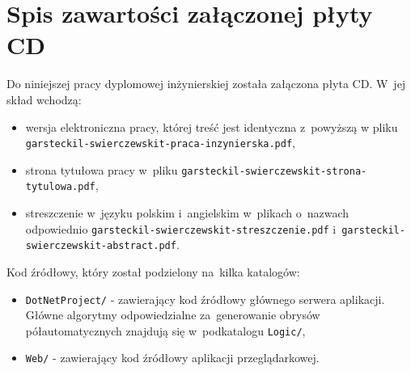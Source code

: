 \documentclass[a4paper,11pt,twoside,openright]{report}
\newcommand\blankpage{%
    \null
    \thispagestyle{empty}%
    \newpage}
\theoremstyle{definition}
\begin{document}



\listoffigures
{}


\afterpage{\blankpage}




\chapter*{Spis zawartości załączonej płyty CD}

Do niniejszej pracy dyplomowej inżynierskiej została załączona płyta CD. W~jej skład wchodzą:
\begin{itemize}[noitemsep]
\item wersja elektroniczna pracy, której treść jest identyczna z~powyższą w
pliku \verb+garsteckil-swierczewskit-praca-inzynierska.pdf+,
\item strona tytułowa pracy w~pliku \verb+garsteckil-swierczewskit-strona-tytulowa.pdf+,
\item streszczenie w~języku polskim i~angielskim w~plikach o~nazwach odpowiednio
\verb+garsteckil-swierczewskit-streszczenie.pdf+ i~\verb+garsteckil-swierczewskit-abstract.pdf+.
\end{itemize}

Kod źródłowy, który został podzielony na~kilka katalogów:
\begin{itemize}
\item \verb+DotNetProject/+ - zawierający kod źródłowy głównego serwera aplikacji.
Główne algorytmy odpowiedzialne za~generowanie obrysów półautomatycznych znajdują się w~podkatalogu \verb+Logic/+,
\item \verb+Web/+ - zawierający kod źródłowy aplikacji przeglądarkowej.
\end{itemize}

\afterpage{\blankpage}

\end{document}

